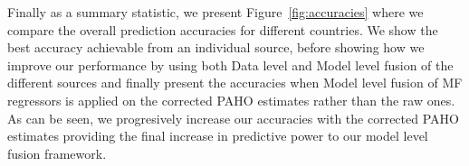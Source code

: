 Finally as a summary statistic, we present Figure~\ref{fig:accuracies} where we compare
the overall prediction accuracies for different countries. We show the best
accuracy achievable from an individual source, before showing how we improve our 
performance by using both Data level and Model level fusion of the different sources and finally 
present the accuracies when Model level fusion of MF regressors is applied on the corrected PAHO 
estimates rather than the raw ones. As can be seen, we progresively increase our accuracies
with the corrected PAHO estimates providing the final increase in predictive power to 
our model level fusion framework.

